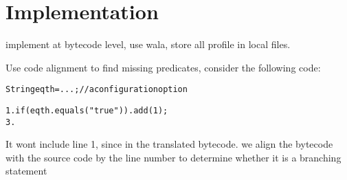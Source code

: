 \section{Implementation}
\label{sec:implementation}

implement at bytecode level, use wala, store all profile in local files.

Use code alignment to find missing predicates, consider the following code:

\begin{CodeOut}
\begin{alltt}
  String eqth = ...; //a configuration option

1. if (eqth.equals("true")) .   add(1);
3. \ttrcb
\end{alltt}
\end{CodeOut}

It wont include  line 1, since in the translated bytecode.
we align the bytecode with the source code by the line number to
determine whether it is a branching statement


